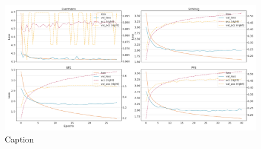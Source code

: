 \begin{figure}[!htb]
    \centering
    \includegraphics[width=\textwidth]{gfx/bpic2011/windowed_loss_acc_curve.png}
    \caption{Caption}
    \label{fig:my_label}
\end{figure}
\FloatBarrier

